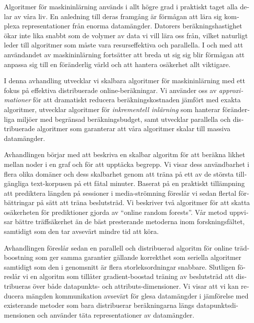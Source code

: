 
\begin{sammanfattning}

\begin{otherlanguage}{swedish}
	Algoritmer för maskininlärning används i allt högre grad i praktiskt taget alla delar av våra liv. En anledning till deras framgång är förmågan att lära sig komplexa representationer från enorma datamängder. Datorers beräkningshastighet ökar inte lika snabbt som de volymer av data vi vill lära oss från, vilket naturligt leder till algoritmer som måste vara resurseffektiva och parallella.
	I och med att användandet av maskininlärning fortsätter att breda ut sig sig blir förmågan att anpassa sig till en föränderlig värld och att hantera osäkerhet allt viktigare.

	I denna avhandling utvecklar vi skalbara algoritmer för maskininlärning med ett fokus på effektiva distribuerade online-beräkningar. Vi använder oss av \emph{approximationer} för att dramatiskt reducera beräkningskostnaden jämfört med exakta algoritmer, utvecklar algoritmer för \emph{inkrementell inlärning} som hanterar föränderliga miljöer med begränsad beräkningsbudget, samt utvecklar parallella och distribuerade algoritmer som garanterar att våra algoritmer skalar till massiva datamängder.

	Avhandlingen börjar med att beskriva en skalbar algoritm för att beräkna likhet mellan noder i en graf och för att upptäcka begrepp. Vi visar dess användbarhet i flera olika domäner och dess skalbarhet genom att träna på ett av de största tillgängliga text-korpusen på ett fåtal minuter.
	Baserat på en praktiskt tillämpning att prediktera längden på sessioner i media-strömning föreslår vi sedan flertal förbättringar på sätt att träna beslutsträd. Vi beskriver två algoritmer för att skatta osäkerheten för prediktioner gjorda av ``online random forests''. Vår metod uppvisar bättre träffsäkerhet än de bäst presterande metoderna inom forskningsfältet, samtidigt som den tar avsevärt mindre tid att köra.

	Avhandlingen föreslår sedan en parallell och distribuerad algoritm för online träd-boostning som ger samma garantier gällande korrekthet som seriella algoritmer samtidigt som den i genomsnitt är flera storleksordningar snabbare.
	Slutligen föreslår vi en algoritm som tillåter gradient-boostad träning av beslutsträd att distribueras över både datapunkts- och attributs-dimensioner. Vi visar att vi kan reducera mängden kommunikation avsevärt för glesa datamängder i jämförelse med existerande metoder som bara distribuerar beräkningarna längs datapunktsdimensionen och använder täta representationer av datamängder.
\end{otherlanguage}

\end{sammanfattning}


